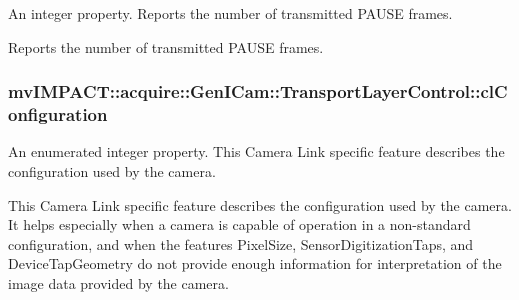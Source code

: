 An integer property. Reports the number of transmitted P\+A\+U\+S\+E frames. 

Reports the number of transmitted P\+A\+U\+S\+E frames. \hypertarget{classmv_i_m_p_a_c_t_1_1acquire_1_1_gen_i_cam_1_1_transport_layer_control_a75d07df2868813a424f936d18627ba58}{
\subsubsection[{cl\+Configuration}]{ mv\+I\+M\+P\+A\+C\+T\+::acquire\+::\+Gen\+I\+Cam\+::\+Transport\+Layer\+Control\+::cl\+Configuration}}\label{classmv_i_m_p_a_c_t_1_1acquire_1_1_gen_i_cam_1_1_transport_layer_control_a75d07df2868813a424f936d18627ba58}


An enumerated integer property. This Camera Link specific feature describes the configuration used by the camera. 

This Camera Link specific feature describes the configuration used by the camera. It helps especially when a camera is capable of operation in a non-\/standard configuration, and when the features Pixel\+Size, Sensor\+Digitization\+Taps, and Device\+Tap\+Geometry do not provide enough information for interpretation of the image data provided by the camera.

